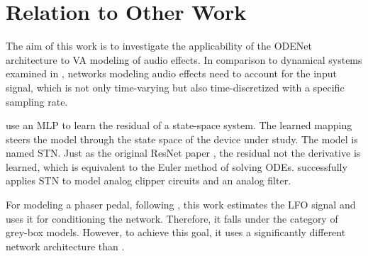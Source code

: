 \section{Relation to Other Work}
\label{sec:relation_to_other_work}
The aim of this work is to investigate the applicability of the ODENet architecture to \ac{VA} modeling of audio effects. In comparison to dynamical systems examined in \cite{Karlsson2019}, networks modeling audio effects need to account for the input signal, which is not only time-varying but also time-discretized with a specific sampling rate. 

\cite{Parker2019} use an \ac{MLP} to learn the residual of a state-space system. The learned mapping steers the model through the state space of the device under study. The model is named \ac{STN}. Just as the original \ac{ResNet} paper \cite{He2015}, the residual not the derivative is learned, which is equivalent to the Euler method of solving \acp{ODE}. \cite{Parker2019} successfully applies \ac{STN} to model analog clipper circuits and an analog filter.

For modeling a phaser pedal, following \cite{Wright2020}, this work estimates the \ac{LFO} signal and uses it for conditioning the network. Therefore, it falls under the category of grey-box models. However, to achieve this goal, it uses a significantly different network architecture than \cite{Wright2020}.

